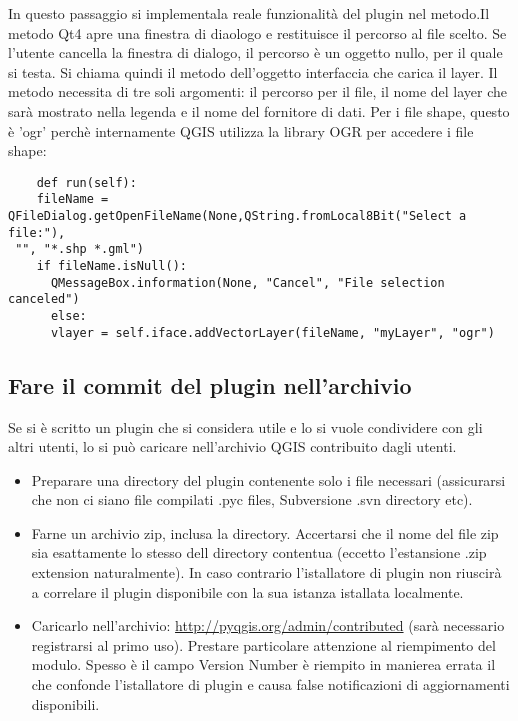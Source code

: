 
In questo passaggio si implementala reale funzionalità del plugin nel
 metodo.Il metodo Qt4 
apre una finestra di diaologo e restituisce il percorso al file scelto. Se l'utente cancella la finestra di dialogo, il percorso è un oggetto nullo, per il quale si testa. Si chiama quindi il metodo  dell'oggetto interfaccia che carica il layer. Il metodo necessita di tre soli argomenti: il percorso per il file, il nome del layer che sarà mostrato nella legenda e il nome del fornitore di dati. Per i file shape, questo è 'ogr' perchè internamente QGIS utilizza la library OGR per accedere i file shape:

\begin{verbatim}
    def run(self):
    fileName = QFileDialog.getOpenFileName(None,QString.fromLocal8Bit("Select a file:"),
 "", "*.shp *.gml")
    if fileName.isNull():
      QMessageBox.information(None, "Cancel", "File selection canceled")
      else:
      vlayer = self.iface.addVectorLayer(fileName, "myLayer", "ogr")
\end{verbatim}


\subsection{Fare il commit del plugin nell'archivio}

Se si è scritto un plugin che si considera utile e lo si vuole condividere con gli altri utenti, lo si può caricare nell'archivio QGIS contribuito dagli utenti.
\begin{itemize}
\item Preparare una directory del plugin contenente solo i file necessari (assicurarsi che non ci siano file compilati .pyc files, Subversione .svn directory etc).
\item Farne un archivio zip, inclusa la directory. Accertarsi che il nome del file zip sia esattamente lo stesso dell directory contentua (eccetto l'estansione .zip extension naturalmente).
In caso contrario l'istallatore di plugin non riuscirà a correlare il plugin disponibile con la sua istanza istallata localmente.
\item Caricarlo nell'archivio: \url{http://pyqgis.org/admin/contributed} (sarà necessario registrarsi al primo uso). Prestare particolare attenzione al riempimento del modulo. Spesso è il campo Version Number è riempito in manierea errata il che confonde l'istallatore di plugin e causa false notificazioni di aggiornamenti disponibili.
\end{itemize}


